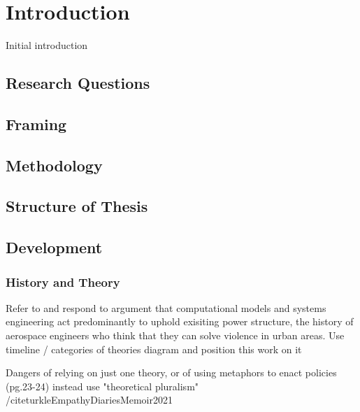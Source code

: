 \chapter{Introduction}

Initial introduction

\section{Research Questions}

\section{Framing}

\section{Methodology}

\section{Structure of Thesis}

\section{Development}

\subsection{History and Theory}

Refer to and respond to argument that computational models and systems engineering act predominantly to uphold exisiting power structure, the history of aerospace engineers who think that they can solve violence in urban areas. Use timeline / categories of theories diagram and position this work on it \cite{mazza2017}

Dangers of relying on just one theory, or of using metaphors to enact policies (pg.23-24) \cite{ostromGoverningCommonsEvolution2015} instead use "theoretical pluralism" /cite{turkleEmpathyDiariesMemoir2021}

